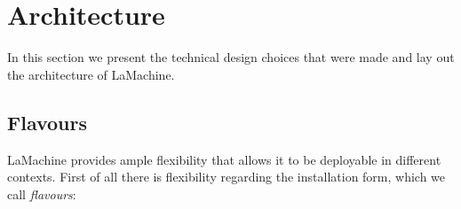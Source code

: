 \documentclass[a4paper,11pt]{article}
\begin{document}
\section{Architecture}

In this section we present the technical design choices that were made and lay out the architecture of LaMachine.

\subsection{Flavours}

LaMachine provides ample flexibility that allows it to be deployable in different contexts. First of all there is
flexibility regarding the installation form, which we call \emph{flavours}:
\end{document}

